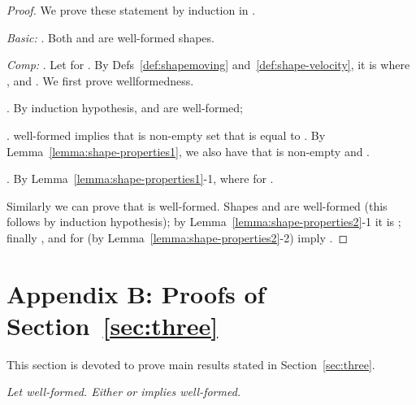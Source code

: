 \documentclass[11pt]{article}
\begin{document}
\begin{proof}
We prove these statement by induction in .
\par\medskip\noindent
{\em Basic:} . Both
 and
 are well-formed shapes.
\par\medskip\noindent
{\em Comp:} .   Let  for
. By Defs~\ref{def:shapemoving} and~\ref{def:shape-velocity}, it is  where , and .
We first prove  wellformedness.

\par\medskip{}. By induction hypothesis,  and  are well-formed;

\par\medskip{}.  well-formed implies that  is non-empty set that is equal to
. By
Lemma~\ref{lemma:shape-properties1}, we also
have that  is non-empty and .

. By Lemma~\ref{lemma:shape-properties1}-1,  where
 for .

\par\medskip\noindent Similarly we can prove that  is well-formed. Shapes
 and  are well-formed (this follows by
induction hypothesis); by Lemma~\ref{lemma:shape-properties2}-1 it is
; finally ,
 and   for  (by Lemma~\ref{lemma:shape-properties2}-2) imply
.
\end{proof}
\section*{Appendix B: Proofs of Section~\ref{sec:three}}
This section is devoted to prove main results stated in Section~\ref{sec:three}.

\par\medskip{}
\em Let  well-formed. Either  or  implies 
well-formed.\rm
\end{document}
